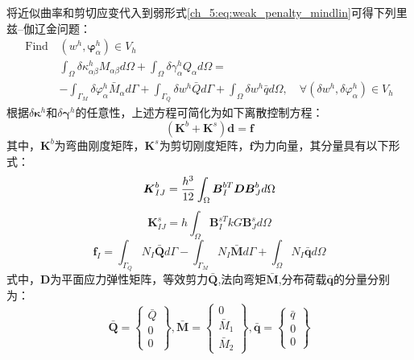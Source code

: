 将近似曲率和剪切应变代入到弱形式\eqref{ch_5:eq:weak_penalty_mindlin}可得下列里兹--伽辽金问题：
\begin{equation}\label{ch_5:eq:ritz_penalty_mindlin}
    \begin{split} 
        \text{Find}\,&(w^h,\boldsymbol{\varphi}^h_{\alpha})\in V_h\\
        &\int_{\Omega}\delta\kappa^h_{\alpha\beta}M_{\alpha\beta}d\Omega+\int_{\Omega}\delta\gamma^h_{\alpha}Q_{\alpha}d\Omega=\\
        &-\int_{\Gamma_{M}}\delta\varphi^h_{\alpha}{\bar{M}_{\alpha}}d\Gamma+\int_{\Gamma_{Q}}{\delta{w^h}}\bar {Q}d\Gamma+\int_{\Omega} \delta{w^h}\bar{q}d\Omega,\quad \forall(\delta w^h,\delta\varphi^h_{\alpha}) \in V_h
    \end{split}
\end{equation}
根据$\delta\boldsymbol\kappa^h$和$\delta\boldsymbol\gamma^h$的任意性，上述方程可简化为如下离散控制方程：
\begin{equation}\label{ch_5:eq:equilibrium_penalty}
    (\boldsymbol K^b + \boldsymbol K^s) \boldsymbol d = \boldsymbol f
\end{equation}
其中，$\boldsymbol K^b$为弯曲刚度矩阵，$\boldsymbol K^s$为剪切刚度矩阵，$\pmb{f}$为力向量，其分量具有以下形式：
\begin{equation}\label{ch_5:eq:stiffness_bending}
    \boldsymbol K^b_{IJ} = \frac{h^3}{12} \int_\Omega \boldsymbol B^{bT}_I \boldsymbol D \boldsymbol B^b_J d\Omega\\
\end{equation}
\begin{equation}\label{ch_5:eq:stiffness_shear}
    \boldsymbol K^s_{IJ} = h \int_\Omega \boldsymbol B^{sT}_I kG \boldsymbol B^s_J d\Omega
\end{equation}
\begin{equation}
    \boldsymbol f_I = \int_{\Gamma_Q} N_I \bar{\boldsymbol Q} d\Gamma - \int_{\Gamma_M} N_I \bar{\boldsymbol M} d\Gamma + \int_\Omega N_I \bar{\boldsymbol q} d\Omega
\end{equation}
式中，$\boldsymbol{D}$为平面应力弹性矩阵，等效剪力$\bar{\boldsymbol Q}$,法向弯矩$\bar{\boldsymbol M}$,分布荷载$\bar{\boldsymbol q}$的分量分别为：
\begin{equation}
    \bar{\boldsymbol Q} =  
    \begin{Bmatrix}
        \bar Q \\ 0 \\ 0
    \end{Bmatrix},
        \bar{\boldsymbol M} =
    \begin{Bmatrix}
        0 \\ \bar M_1 \\ \bar M_2
    \end{Bmatrix},
        \bar{\boldsymbol q} =
    \begin{Bmatrix}
        \bar q \\ 0 \\ 0
    \end{Bmatrix}
\end{equation}

